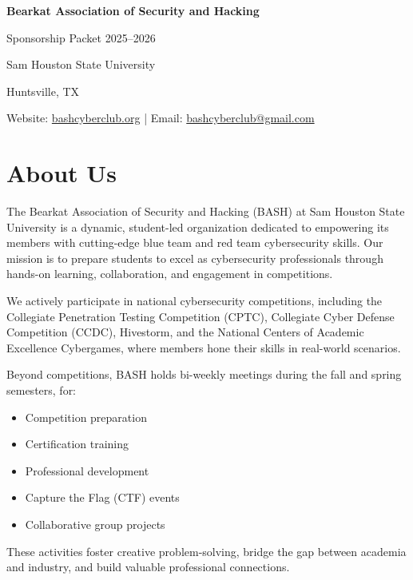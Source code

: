 \documentclass[11pt,letterpaper]{article}
\begin{document}
\begin{titlepage}
    \centering
    \vspace*{2cm}
    {\Huge\color{primaryorange}\textbf{Bearkat Association of Security and Hacking}\par}
    \vspace{0.5cm}
    {\Large Sponsorship Packet 2025--2026}\par
    \vspace{2cm}
    {\large Sam Houston State University}\par
    \vspace{0.5cm}
    {\large Huntsville, TX}\par
    \vfill
    {\normalsize Website: \url{bashcyberclub.org} | Email: \href{mailto:bashcyberclub@gmail.com}{bashcyberclub@gmail.com}}\par
    \vspace{1cm}
\end{titlepage}

\section*{About Us}
The Bearkat Association of Security and Hacking (BASH) at Sam Houston State University is a dynamic, student-led organization dedicated to empowering its members with cutting-edge blue team and red team cybersecurity skills. Our mission is to prepare students to excel as cybersecurity professionals through hands-on learning, collaboration, and engagement in competitions.

We actively participate in national cybersecurity competitions, including the Collegiate Pen\-e\-tra\-tion Testing Com\-pe\-ti\-tion (C\-P\-T\-C), Collegiate Cyber Defense Com\-pe\-ti\-tion (C\-C\-D\-C), Hive\-storm, and the National Centers of Academic Excellence Cy\-ber\-games, where members hone their skills in real-world scenarios.

Beyond competitions, BASH holds bi-weekly meetings during the fall and spring semesters, for:
\begin{itemize}
    \item Competition preparation
    \item Certification training
    \item Professional development
    \item Capture the Flag (CTF) events
    \item Collaborative group projects
\end{itemize}
These activities foster creative problem-solving, bridge the gap between academia and industry, and build valuable professional connections.
\end{document}
